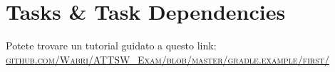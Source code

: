 \section{Tasks \& Task Dependencies}
Potete trovare un tutorial guidato a questo link: \href{https://github.com/Wabri/ATTSW_Exam/blob/master/gradle.example/first/}{\textsc{github.com/Wabri/ATTSW\_Exam/blob/master/gradle.example/first/}}



